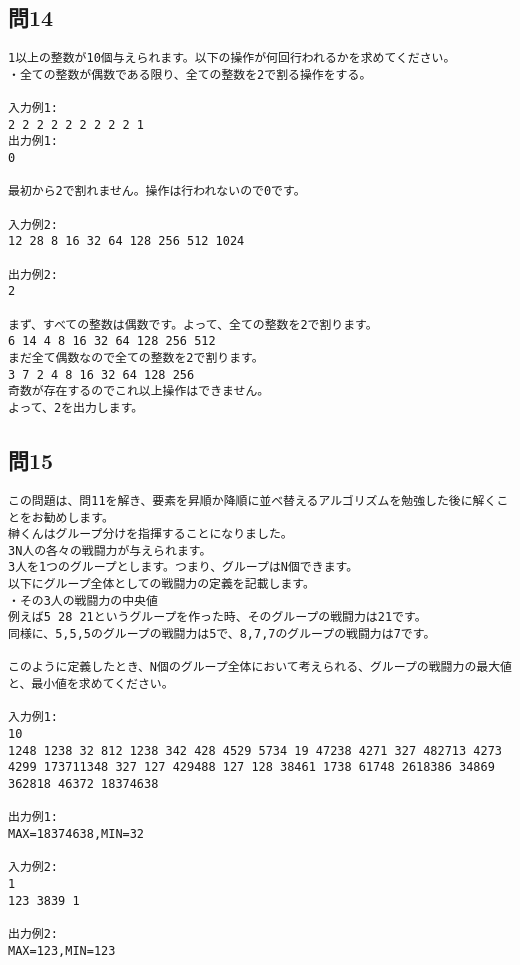 \subsection{問14}
\begin{verbatim}
1以上の整数が10個与えられます。以下の操作が何回行われるかを求めてください。
・全ての整数が偶数である限り、全ての整数を2で割る操作をする。

入力例1:
2 2 2 2 2 2 2 2 2 1
出力例1:
0

最初から2で割れません。操作は行われないので0です。

入力例2:
12 28 8 16 32 64 128 256 512 1024

出力例2:
2

まず、すべての整数は偶数です。よって、全ての整数を2で割ります。
6 14 4 8 16 32 64 128 256 512
まだ全て偶数なので全ての整数を2で割ります。
3 7 2 4 8 16 32 64 128 256
奇数が存在するのでこれ以上操作はできません。
よって、2を出力します。
\end{verbatim}

\subsection{問15}
\begin{verbatim}
この問題は、問11を解き、要素を昇順か降順に並べ替えるアルゴリズムを勉強した後に解くことをお勧めします。
榊くんはグループ分けを指揮することになりました。
3N人の各々の戦闘力が与えられます。
3人を1つのグループとします。つまり、グループはN個できます。
以下にグループ全体としての戦闘力の定義を記載します。
・その3人の戦闘力の中央値
例えば5 28 21というグループを作った時、そのグループの戦闘力は21です。
同様に、5,5,5のグループの戦闘力は5で、8,7,7のグループの戦闘力は7です。

このように定義したとき、N個のグループ全体において考えられる、グループの戦闘力の最大値と、最小値を求めてください。

入力例1:
10
1248 1238 32 812 1238 342 428 4529 5734 19 47238 4271 327 482713 4273 4299 173711348 327 127 429488 127 128 38461 1738 61748 2618386 34869 362818 46372 18374638

出力例1:
MAX=18374638,MIN=32

入力例2:
1
123 3839 1

出力例2:
MAX=123,MIN=123
\end{verbatim}
